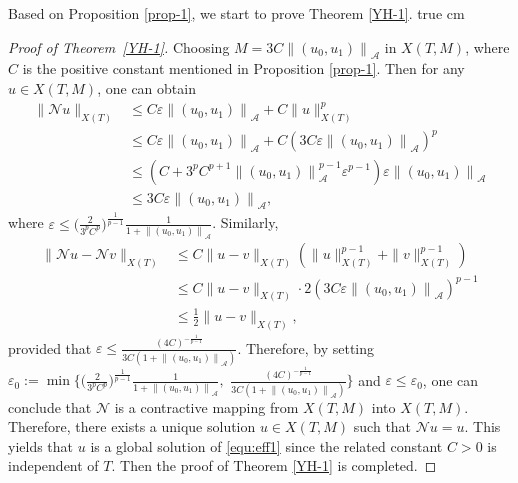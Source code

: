 \documentclass[11pt,twoside]{article}
\newcommand{\ve}{\varepsilon}
\newcommand{\f}{\frac}
\theoremstyle{plain}
\theoremstyle{definition}
\theoremstyle{remark}
\numberwithin{equation}{section}
\begin{document}
Based on Proposition \ref{prop-1}, we start to prove Theorem \ref{YH-1}.
 true cm

\begin{proof}
[Proof of Theorem~\ref{YH-1}]
 Choosing $M=3C\left\|\left(u_{0}, u_{1}\right)\right\|_{\mathcal{A}}$ in $X(T, M)$, where $C$ is the positive constant mentioned in
 Proposition \ref{prop-1}. Then for any $u \in X(T, M)$, one can obtain
\begin{equation}\label{L6}
\begin{aligned}
\|\mathcal{N} u\|_{X(T)}
& \leq C\ve\left\|\left(u_{0}, u_{1}\right)\right\|_{\mathcal{A}}+C\|u\|_{X(T)}^{p} \\
& \leq C \ve\left\|\left(u_{0}, u_{1}\right)\right\|_{\mathcal{A}}+C\left(3 C\ve\left\|\left(u_{0}, u_{1}\right)\right\|_{\mathcal{A}}\right)^{p} \\
& \leq\left(C+3^{p} C^{p+1}\left\|\left(u_{0}, u_{1}\right)\right\|_{\mathcal{A}}^{p-1}\ve^{p-1}\right)\ve\left\|\left(u_{0}, u_{1}\right)\right\|_{\mathcal{A}} \\
& \leq 3 C\ve\left\|\left(u_{0}, u_{1}\right)\right\|_{\mathcal{A}},
\end{aligned}
\end{equation}
where $\ve\le \big(\f{2}{3^pC^p}\big)^{\f{1}{p-1}}\f{1}{1+\left\|\left(u_{0}, u_{1}\right)\right\|_{\mathcal{A}}}$. Similarly,
\begin{equation}\label{L7}
\begin{aligned}
\|\mathcal{N} u-\mathcal{N} v\|_{X(T)} &\leq C\|u-v\|_{X(T)}\left(\|u\|_{X(T)}^{p-1}+\|v\|_{X(T)}^{p-1}\right)\\
&\leq C\|u-v\|_{X(T)}\cdot2\left(3 C\ve\left\|\left(u_{0}, u_{1}\right)\right\|_{\mathcal{A}}\right)^{p-1}\\
&\leq \f{1}{2}\|u-v\|_{X(T)},
\end{aligned}
\end{equation}
provided that $\ve\le\f{{(4C)}^{-\f{1}{p-1}}}{3C(1+\left\|\left(u_{0}, u_{1}\right)\right\|_{\mathcal{A}})}$. Therefore,
by setting $\varepsilon_0:=\min\{\big(\f{2}{3^pC^p}\big)^{\f{1}{p-1}}\f{1}{1+\left\|\left(u_{0}, u_{1}\right)\right\|_{\mathcal{A}}},$
$\f{{(4C)}^{-\f{1}{p-1}}}{3C(1+\left\|\left(u_{0}, u_{1}\right)\right\|_{\mathcal{A}})}\}$ and $\ve\leq \varepsilon_0$,
one can conclude that $\mathcal{N}$ is a contractive mapping from $X(T, M)$ into $X(T, M)$. Therefore, there exists a unique solution $u \in X(T, M)$ such that
$\mathcal{N}u=u$. This yields that $u$ is a global solution  of \eqref{equ:eff1} since the related constant $C>0$ is independent
of $T$. Then the proof of Theorem \ref{YH-1} is completed.
\end{proof}
\end{document}
